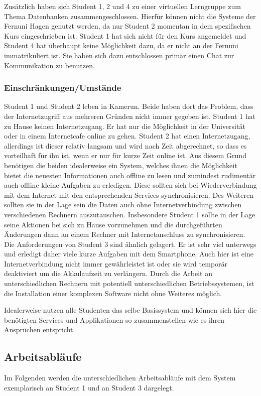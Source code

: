 Zusätzlich haben sich Student 1, 2 und 4 zu einer virtuellen Lerngruppe zum Thema Datenbanken zusammengeschlossen. Hierfür können nicht die Systeme der Fernuni Hagen genutzt werden, da nur Student 2 momentan in dem spezifischen Kurs eingeschrieben ist. Student 1 hat sich nicht für den Kurs angemeldet und Student 4 hat überhaupt keine Möglichkeit dazu, da er nicht an der Fernuni immatrikuliert ist. Sie haben sich dazu entschlossen primär einen Chat zur Kommunikation zu benutzen.

\subsubsection{Einschränkungen/Umstände}
Student 1 und Student 2 leben in Kamerun. Beide haben dort das Problem, dass der Internetzugriff aus mehreren Gründen nicht immer gegeben ist. Student 1 hat zu Hause keinen Internetzugang. Er hat nur die Möglichkeit in der Universität oder in einem Internetcafe online zu gehen. Student 2 hat einen Internetzugang, allerdings ist dieser relativ langsam und wird nach Zeit abgerechnet, so dass es vorteilhaft für ihn ist, wenn er nur für kurze Zeit online ist. Aus diesem Grund benötigen die beiden idealerweise ein System, welches ihnen die Möglichkeit bietet die neuesten Informationen auch offline zu lesen und zumindest rudimentär auch offline kleine Aufgaben zu erledigen. Diese sollten sich bei Wiederverbindung mit dem Internet mit den entsprechenden Services synchronisieren. Des Weiteren sollten sie in der Lage sein die Daten auch ohne Internetverbindung zwischen verschiedenen Rechnern auszutauschen. Insbesondere Student 1 sollte in der Lage seine Aktionen bei sich zu Hause vorzunehmen und die durchgeführten Änderungen dann an einem Rechner mit Internetanschluss zu synchronisieren. Die Anforderungen von Student 3 sind ähnlich gelagert. Er ist sehr viel unterwegs und erledigt daher viele kurze Aufgaben mit dem Smartphone. Auch hier ist eine Internetverbindung nicht immer gewährleistet ist oder sie wird temporär deaktiviert um die Akkulaufzeit zu verlängern. Durch die Arbeit an unterschiedlichen Rechnern mit potentiell unterschiedlichen Betriebssystemen, ist die Installation einer komplexen Software nicht ohne Weiteres möglich.

Idealerweise nutzen alle Studenten das selbe Basissystem und können sich hier die benötigten Services und Applikationen so zusammenstellen wie es ihren Ansprüchen entspricht.

\subsection{Arbeitsabläufe}
Im Folgenden werden die unterschiedlichen Arbeitsabläufe mit dem System exemplarisch an Student 1 und an Student 3 dargelegt.


